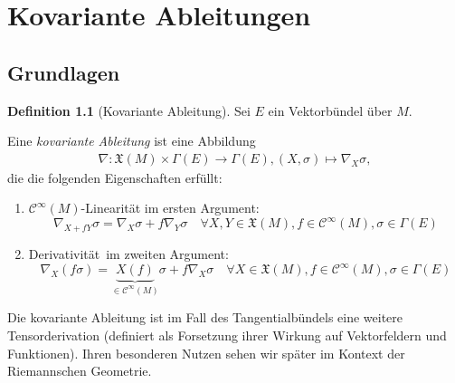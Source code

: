 \documentclass[a4paper]{scrreprt}
\numberwithin{equation}{chapter}
\newcommand{\sC}{\mathcal{C}^{\infty}}
\newcommand{\vf}{\mathfrak{X}}
\theoremstyle{definition}
\newtheorem{defn}{Definition}[section]
\begin{document}
\chapter{Kovariante Ableitungen}
	\section{Grundlagen}
		\begin{defn}[Kovariante Ableitung]Sei $E$ ein Vektorbündel über $M$.
		
			Eine \emph{kovariante Ableitung} ist eine Abbildung
			\begin{align*}
				\nabla\colon \vf(M)\times\Gamma(E)\rightarrow\Gamma(E), (X,\sigma)\mapsto \nabla_X \sigma,
			\end{align*}
			die die folgenden Eigenschaften erfüllt:
			\begin{enumerate}[label=\arabic*]
				\item $\sC(M)$-Linearität im ersten Argument: 
				\begin{equation*}
					\nabla_{X+fY}\sigma=\nabla_X\sigma+f\nabla_Y \sigma\quad\forall X,Y\in\vf(M), f\in\sC(M),\sigma\in\Gamma(E)
				\end{equation*}
				\item \glqq Derivativität\grqq\ im zweiten Argument: 
				\begin{equation*}
					\nabla_X(f\sigma)=\underbrace{X(f)}_{\in\sC(M)} \sigma+f\nabla_X \sigma\quad\forall X\in\vf(M), f\in\sC(M),\sigma\in\Gamma(E)
				\end{equation*}
			\end{enumerate}
		\end{defn}
		Die kovariante Ableitung ist im Fall des Tangentialbündels eine weitere Tensorderivation (definiert als Forsetzung ihrer Wirkung auf Vektorfeldern und Funktionen). Ihren besonderen Nutzen sehen wir später im Kontext der Riemannschen Geometrie.
		
\end{document}
